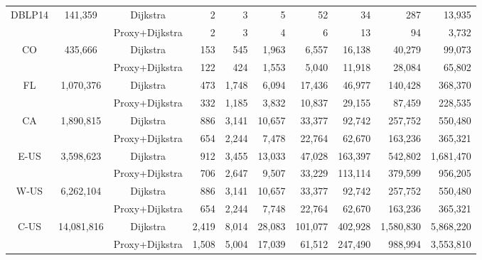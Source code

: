 \begin{table}[t!]
\begin{center}
\begin{scriptsize}
\begin{tabular}{|c|c|c||r|r|r|r|r|r|r|}
\multirow{2}{*}{DBLP14}& \multirow{2}{*}{141,359} & Dijkstra & 2 & 3 & 5 & 52 & 34 & 287 & 13,935 \\ \cline{3-10}
                   &   & Proxy+Dijkstra & 2 & 3 & 4 & 6 & 13 & 94 & 3,732 \\ \hline\hline
\multirow{2}{*}{CO}&\multirow{2}{*}{435,666}  & Dijkstra & 153 & 545 & 1,963 & 6,557 & 16,138 & 40,279 & 99,073 \\ \cline{3-10}
                  & & Proxy+Dijkstra  & 122 & 424 & 1,553 & 5,040 & 11,918 & 28,084 & 65,802 \\ \hline
\multirow{2}{*}{FL}&\multirow{2}{*}{1,070,376}  & Dijkstra & 473 & 1,748 & 6,094 & 17,436 & 46,977 & 140,428 & 368,370 \\ \cline{3-10}
                   & & Proxy+Dijkstra & 332 & 1,185 & 3,832 & 10,837 & 29,155 & 87,459 & 228,535 \\ \hline
\multirow{2}{*}{CA}&\multirow{2}{*}{1,890,815}  & Dijkstra & 886 & 3,141 & 10,657 & 33,377 & 92,742 & 257,752 & 550,480 \\ \cline{3-10}
                   &  & Proxy+Dijkstra & 654 & 2,244 & 7,478 & 22,764 & 62,670 & 163,236 & 365,321 \\ \hline
\multirow{2}{*}{E-US}&\multirow{2}{*}{3,598,623} & Dijkstra&912 & 3,455 & 13,033 & 47,028 & 163,397 & 542,802 & 1,681,470 \\ \cline{3-10}
                   & & Proxy+Dijkstra & 706 & 2,647 & 9,507 & 33,229 & 113,114 & 379,599 & 956,205 \\ \hline
\multirow{2}{*}{W-US}&\multirow{2}{*}{6,262,104} & Dijkstra & 886 & 3,141 & 10,657 & 33,377 & 92,742 & 257,752 & 550,480 \\ \cline{3-10}
                   & & Proxy+Dijkstra & 654 & 2,244 & 7,748 & 22,764 & 62,670 & 163,236 & 365,321 \\ \hline
\multirow{2}{*}{C-US}&\multirow{2}{*}{14,081,816} & Dijkstra & 2,419 & 8,014 & 28,083 & 101,077 & 402,928 & 1,580,830 & 5,868,220 \\ \cline{3-10}
                  & & Proxy+Dijkstra & 1,508 & 5,004 & 17,039 & 61,512 & 247,490 & 988,994 & 3,553,810 \\ \hline
\end{tabular}
\end{scriptsize}
\end{center}
\vspace{-2ex}
\end{table}

